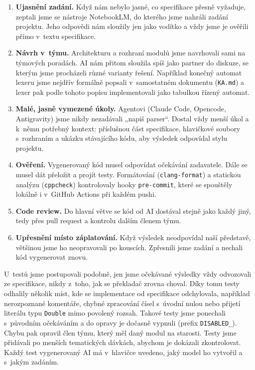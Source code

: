 \documentclass[a4paper,11pt]{article}
\begin{document}
\begin{enumerate}
  \item \textbf{Ujasnění zadání.} Když nám nebylo jasné, co specifikace
        přesně vyžaduje, zeptali jsme se nástroje NotebookLM, do kterého jsme
        nahráli zadání projektu. Jeho odpovědi nám sloužily jen jako vodítko
        a vždy jsme je ověřili přímo v~textu specifikace.
  \item \textbf{Návrh v~týmu.} Architekturu a rozhraní modulů jsme navrhovali
        sami na týmových poradách. AI nám přitom sloužila spíš jako partner do
        diskuze, se kterým jsme procházeli různé varianty řešení. Například
        konečný automat lexeru jsme nejdřív formálně popsali v~samostatném
        dokumentu (\texttt{KA.md}) a lexer pak podle tohoto popisu
        implementovali jako tabulkou řízený automat.
  \item \textbf{Malé, jasně vymezené úkoly.} Agentovi (Claude Code, Opencode,
        Antigravity) jsme nikdy nezadávali „napiš parser“. Dostal vždy menší
        úkol a k~němu potřebný kontext: příslušnou část specifikace, hlavičkové
        soubory s~rozhraním a ukázku stávajícího kódu, aby výsledek odpovídal
        stylu projektu.
  \item \textbf{Ověření.} Vygenerovaný kód musel odpovídat očekávání zadavatele.          Dále se musel dát přeložit a projít testy.
        Formátování (\texttt{clang-format}) a statickou analýzu
        (\texttt{cppcheck}) kontrolovaly hooky \texttt{pre-commit}, které
        se spouštěly lokálně i v~GitHub Actions při každém pushi.
  \item \textbf{Code review.} Do hlavní větve se kód od AI dostával stejně
        jako každý jiný, tedy přes pull request a kontrolu dalším členem týmu.
  \item \textbf{Upřesnění místo záplatování.} Když výsledek neodpovídal naší
        představě, většinou jsme ho neopravovali po kouscích. Zpřesnili jsme
        zadání a nechali kód vygenerovat znovu.
\end{enumerate}

U~testů jsme postupovali podobně, jen jsme očekávané výsledky vždy odvozovali
ze specifikace, nikdy z~toho, jak se překladač zrovna choval. Díky tomu testy
odhalily několik míst, kde se implementace od specifikace odchylovala,
například nerozpoznané komentáře, chybné zpracování čísel s~úvodní nulou nebo
přijetí literálu typu \texttt{Double} mimo povolený rozsah. Takové testy jsme
ponechali s~původním očekáváním a do opravy je dočasně vypnuli (prefix
\texttt{DISABLED\_}). Chybu pak opravil člen týmu, který měl daný modul
na starosti. Testy jsme přidávali po menších tematických dávkách, abychom
je dokázali zkontrolovat. Každý test vygenerovaný AI má v~hlavičce uvedeno,
jaký model ho vytvořil a s~jakým zadáním.
\end{document}
